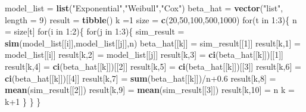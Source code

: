 \documentclass[]{article}
\newenvironment{Shaded}{\begin{snugshade}}{\end{snugshade}}
\newcommand{\KeywordTok}[1]{\textcolor[rgb]{0.13,0.29,0.53}{\textbf{{#1}}}}
\newcommand{\DataTypeTok}[1]{\textcolor[rgb]{0.13,0.29,0.53}{{#1}}}
\newcommand{\DecValTok}[1]{\textcolor[rgb]{0.00,0.00,0.81}{{#1}}}
\newcommand{\FloatTok}[1]{\textcolor[rgb]{0.00,0.00,0.81}{{#1}}}
\newcommand{\StringTok}[1]{\textcolor[rgb]{0.31,0.60,0.02}{{#1}}}
\newcommand{\NormalTok}[1]{{#1}}
\begin{document}
\begin{Shaded}
\begin{Highlighting}[]
\NormalTok{model_list =}\StringTok{ }\KeywordTok{list}\NormalTok{(}\StringTok{"Exponential"}\NormalTok{,}\StringTok{"Weibull"}\NormalTok{,}\StringTok{"Cox"}\NormalTok{)}
\NormalTok{beta_hat =}\StringTok{ }\KeywordTok{vector}\NormalTok{(}\StringTok{"list"}\NormalTok{, }\DataTypeTok{length =} \DecValTok{9}\NormalTok{)}
\NormalTok{result =}\StringTok{ }\KeywordTok{tibble}\NormalTok{()}
\NormalTok{k =}\DecValTok{1}
\NormalTok{size =}\StringTok{ }\KeywordTok{c}\NormalTok{(}\DecValTok{20}\NormalTok{,}\DecValTok{50}\NormalTok{,}\DecValTok{100}\NormalTok{,}\DecValTok{500}\NormalTok{,}\DecValTok{1000}\NormalTok{)}
\NormalTok{for(t in }\DecValTok{1}\NormalTok{:}\DecValTok{3}\NormalTok{)\{}
  \NormalTok{n =}\StringTok{ }\NormalTok{size[t]}
\NormalTok{for(i in }\DecValTok{1}\NormalTok{:}\DecValTok{2}\NormalTok{)\{}
  \NormalTok{for(j in }\DecValTok{1}\NormalTok{:}\DecValTok{3}\NormalTok{)\{}
  \NormalTok{sim_result =}\StringTok{ }\KeywordTok{sim}\NormalTok{(model_list[[i]],model_list[[j]],n)}
  \NormalTok{beta_hat[[k]] =}\StringTok{ }\NormalTok{sim_result[[}\DecValTok{1}\NormalTok{]]}
  \NormalTok{result[k,}\DecValTok{1}\NormalTok{] =}\StringTok{ }\NormalTok{model_list[[i]]}
  \NormalTok{result[k,}\DecValTok{2}\NormalTok{] =}\StringTok{ }\NormalTok{model_list[[j]]}
  \NormalTok{result[k,}\DecValTok{3}\NormalTok{] =}\StringTok{ }\KeywordTok{ci}\NormalTok{(beta_hat[[k]])[[}\DecValTok{1}\NormalTok{]]}
  \NormalTok{result[k,}\DecValTok{4}\NormalTok{] =}\StringTok{ }\KeywordTok{ci}\NormalTok{(beta_hat[[k]])[[}\DecValTok{2}\NormalTok{]]}
  \NormalTok{result[k,}\DecValTok{5}\NormalTok{] =}\StringTok{ }\KeywordTok{ci}\NormalTok{(beta_hat[[k]])[[}\DecValTok{3}\NormalTok{]]}
  \NormalTok{result[k,}\DecValTok{6}\NormalTok{] =}\StringTok{ }\KeywordTok{ci}\NormalTok{(beta_hat[[k]])[[}\DecValTok{4}\NormalTok{]]}
  \NormalTok{result[k,}\DecValTok{7}\NormalTok{] =}\StringTok{ }\KeywordTok{sum}\NormalTok{(beta_hat[[k]])/n}\FloatTok{+0.6}
  \NormalTok{result[k,}\DecValTok{8}\NormalTok{] =}\StringTok{ }\KeywordTok{mean}\NormalTok{(sim_result[[}\DecValTok{2}\NormalTok{]])}
  \NormalTok{result[k,}\DecValTok{9}\NormalTok{] =}\StringTok{ }\KeywordTok{mean}\NormalTok{(sim_result[[}\DecValTok{3}\NormalTok{]])}
  \NormalTok{result[k,}\DecValTok{10}\NormalTok{] =}\StringTok{ }\NormalTok{n}
  \NormalTok{k =}\StringTok{ }\NormalTok{k}\DecValTok{+1}
  \NormalTok{\}}
\NormalTok{\}}
\NormalTok{\}}
\end{Highlighting}
\end{Shaded}
\end{document}
